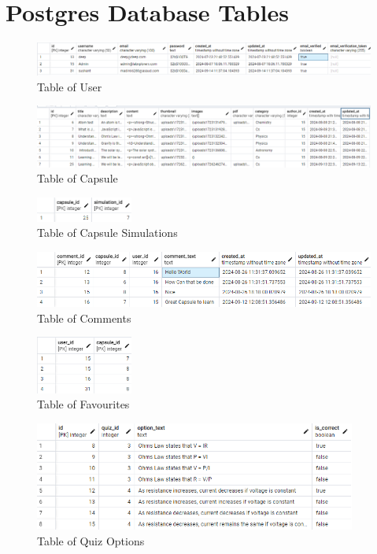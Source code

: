 \section{Postgres Database Tables}
\begin{figure}[H]
    \centering
        \includegraphics[width=430px]{Diagrams/db/user.png}
    \caption{Table of User}
\end{figure}
\begin{figure}[H]
    \centering
        \includegraphics[width=430px]{Diagrams/db/capsules.png}
    \caption{Table of Capsule}
\end{figure}
\begin{figure}[H]
    \centering
        \includegraphics[width=120px]{Diagrams/db/capsule_sim.png}
    \caption{Table of Capsule Simulations}
\end{figure}
\begin{figure}[H]
    \centering
        \includegraphics[width=430px]{Diagrams/db/comment.png}
    \caption{Table of Comments}
\end{figure}
\begin{figure}[H]
    \centering
        \includegraphics[width=120px]{Diagrams/db/fav.png}
    \caption{Table of Favourites}
\end{figure}
\begin{figure}[H]
    \centering
        \includegraphics[width=400px]{Diagrams/db/options.png}
    \caption{Table of Quiz Options}
\end{figure}
